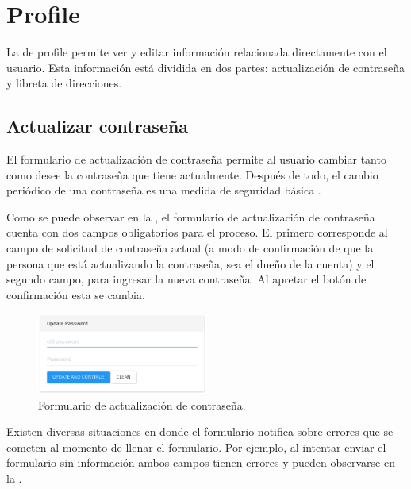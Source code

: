 \section{Profile}

	La \uiSiglaAS de profile permite ver y editar información relacionada directamente con el usuario. Esta información está dividida en dos partes: actualización de contraseña y libreta de direcciones.

	\subsection{Actualizar contraseña}

		El formulario de actualización de contraseña permite al usuario cambiar tanto como desee la contraseña que tiene actualmente. Después de todo, el cambio periódico de una contraseña es una medida de seguridad básica \cite{zviran1999password}.

		Como se puede observar en la , el formulario de actualización de contraseña cuenta con dos campos obligatorios para el proceso. El primero corresponde al campo de solicitud de contraseña actual (a modo de confirmación de que la persona que está actualizando la contraseña, sea el dueño de la cuenta) y el segundo campo, para ingresar la nueva contraseña. Al apretar el botón de confirmación esta se cambia.

		\begin{figure}[h!]
			\centering
			\includegraphics[width=0.5\textwidth]{figuras/profile/form_update_password.png}

			\caption{Formulario de actualización de contraseña.}
			\label{figure:profile:form:form_update_password}
		\end{figure}

		Existen diversas situaciones en donde el formulario notifica sobre errores que se cometen  al momento de llenar el formulario. Por ejemplo, al intentar enviar el formulario sin información ambos campos tienen errores y pueden observarse en la .



